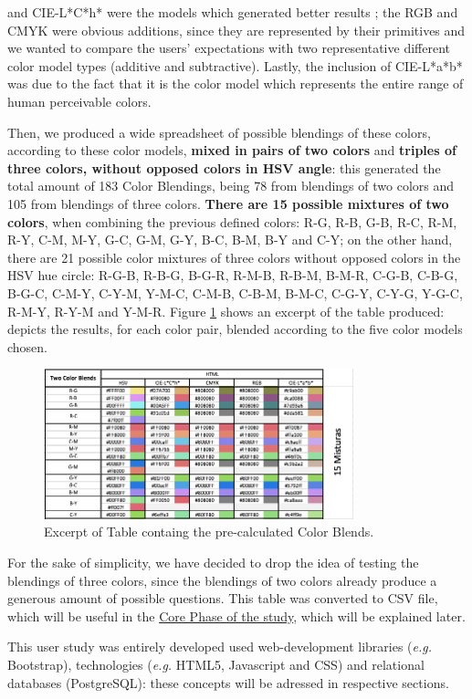 and CIE-L*C*h* were the models which generated better results \cite{Gama20141,Gama20142}; the RGB and CMYK were obvious
additions, since they are represented by their primitives and we wanted to compare the users' expectations with two
representative different color model types (additive and subtractive). Lastly, the inclusion of CIE-L*a*b* was due to the fact
that it is the color model which represents the entire range of human perceivable colors. \par
%
Then, we produced a wide spreadsheet of possible blendings of these colors, according to these color models, \textbf{mixed in
pairs of two colors} and \textbf{triples of three colors, without opposed colors in HSV angle}: this generated the total amount
of 183 Color Blendings, being 78 from blendings of two colors and 105 from blendings of three colors. \textbf{There are 15
possible mixtures of two colors}, when combining the previous defined colors: R-G, R-B, G-B, R-C, R-M, R-Y, C-M, M-Y, G-C, G-M,
G-Y, B-C, B-M, B-Y and C-Y; on the other hand, there are 21 possible color mixtures of three colors without opposed colors in the
HSV hue circle: R-G-B, R-B-G, B-G-R, R-M-B, R-B-M, B-M-R, C-G-B, C-B-G, B-G-C, C-M-Y, C-Y-M, Y-M-C, C-M-B, C-B-M, B-M-C, C-G-Y,
C-Y-G, Y-G-C, R-M-Y, R-Y-M and Y-M-R. Figure \ref{fig:table_blends} shows an excerpt of the table produced: depicts the results,
for each color pair, blended according to the five color models chosen.
%
\begin{figure}[htbp]
	\centering
  \includegraphics[width=0.8\textwidth]{images/implementation/table_blends.png}
  \caption[Excerpt of Table containg the pre-calculated Color Blends.]{Excerpt of Table containg the pre-calculated Color Blends.}
  \label{fig:table_blends}
\end{figure} \par
%
For the sake of simplicity, we have decided to drop the idea of testing the blendings of three colors, since the blendings of two
colors already produce a generous amount of possible questions. This table was converted to \gls{CSV} file, which will be useful
in the \ul{Core Phase of the study}, which will be explained later. \par
%
This user study was entirely developed used web-development libraries (\emph{e.g.} Bootstrap), technologies (\emph{e.g.} HTML5, Javascript
and CSS) and relational databases (PostgreSQL): these concepts will be adressed in respective sections.
%

